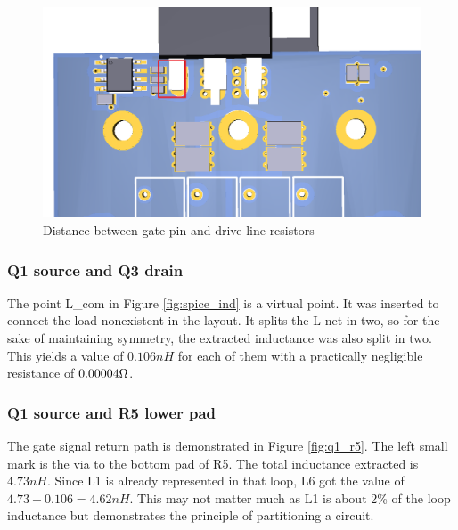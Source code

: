 \begin{figure}[H]
	\centering
	\includegraphics[width=\textwidth]{pictures/implementation/ind/Q1_gate.png}
	\caption{Distance between gate pin and drive line resistors}
	\label{fig:q1_gate}
\end{figure}

\subsubsection{Q1 source and Q3 drain}

The point L\_com in Figure \ref{fig:spice_ind} is a virtual point. It was inserted to connect the load nonexistent in the layout. It splits the L net in two, so for the sake of maintaining symmetry, the extracted inductance was also split in two. This yields a value of $0.106 nH$ for each of them with a practically negligible resistance of $0.00004 \ohm$.

\subsubsection{Q1 source and R5 lower pad}
\label{sec:q1_r5}

The gate signal return path is demonstrated in Figure \ref{fig:q1_r5}. The left small mark is the via to the bottom pad of R5. The total inductance extracted is $4.73 nH$. Since L1 is already represented in that loop, L6 got the value of $4.73 - 0.106 = 4.62 nH$. This may not matter much as L1 is about 2\% of the loop inductance but demonstrates the principle of partitioning a circuit.

